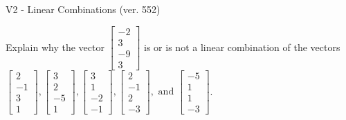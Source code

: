 \begin{exercise}
  \begin{exerciseTitle}V2 - Linear Combinations (ver. 552)\end{exerciseTitle}
  \begin{exerciseStatement}
    Explain why the vector \(\left[\begin{array}{c}
-2 \\
3 \\
-9 \\
3
\end{array}\right]\)  is or is not a linear 
	combination of the vectors \(\left[\begin{array}{c}
2 \\
-1 \\
3 \\
1
\end{array}\right] , \left[\begin{array}{c}
3 \\
2 \\
-5 \\
1
\end{array}\right] , \left[\begin{array}{c}
3 \\
1 \\
-2 \\
-1
\end{array}\right] , \left[\begin{array}{c}
2 \\
-1 \\
2 \\
-3
\end{array}\right] , \text{ and } \left[\begin{array}{c}
-5 \\
1 \\
1 \\
-3
\end{array}\right]\).
	



\end{exerciseStatement}
\end{exercise}
